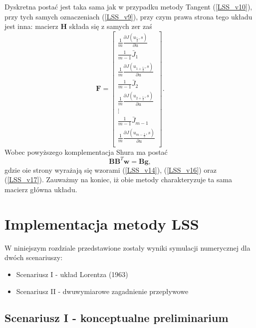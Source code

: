 \documentclass[12pt, twoside]{book}
\begin{document}
Dyskretna postać jest taka sama jak w przypadku metody Tangent (\ref{LSS_v10}), przy tych samych oznaczeniach (\ref{LSS_v9}), przy czym prawa strona tego układu jest inna: macierz $ \textbf{H} $ składa się z samych zer zaś
\begin{equation}
\textbf{F} = \begin{bmatrix}
\frac{1}{m}\frac{\partial J(u_{\frac{1}{2}},s)}{\partial u} \\
\frac{1}{m-1}\bar{J}_{1} \\
\frac{1}{m}\frac{\partial J(u_{1+\frac{1}{2}},s)}{\partial u}\\
\frac{1}{m-1}\bar{J}_{2} \\
\frac{1}{m}\frac{\partial J(u_{2+\frac{1}{2}},s)}{\partial u}\\
\vdots \\
\frac{1}{m-1}\bar{J}_{m-1} \\
\frac{1}{m}\frac{\partial J(u_{m-\frac{1}{2}},s)}{\partial u}\\
\end{bmatrix}.
\label{LSS_v23}
\end{equation}
Wobec powyższego komplementacja Shura ma postać 
\begin{equation}
\textbf{B}\textbf{B}^{T}\textbf{w} = \textbf{B}\textbf{g}
\label{LSS_v24},
\end{equation}
gdzie oie strony wyrażają się wzorami (\ref{LSS_v14}), (\ref{LSS_v16}) oraz (\ref{LSS_v17}). \newline
Zauważmy na koniec, iż obie metody charakteryzuje ta sama macierz główna układu.
\newpage
\chapter{Implementacja metody LSS}
W niniejszym rozdziale przedstawione zostały wyniki symulacji numerycznej dla dwóch scenariuszy:
\begin{itemize}
	\item Scenariusz I - układ Lorentza (1963)
	\item Scenariusz II - dwuwymiarowe zagadnienie przepływowe
\end{itemize}
\section{Scenariusz I - konceptualne preliminarium}
\end{document}
